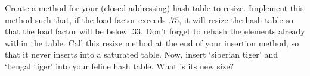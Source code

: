 \begin{problem}
Create a method for your (closed addressing) hash table to resize.
Implement this method such that, if the load factor exceeds $.75$, it will resize the hash table so that the load factor will be below $.33$.
Don't forget to rehash the elements already within the table. 
Call this resize method at the end of your insertion method, so that it never inserts into a saturated table.
Now, insert `siberian tiger' and `bengal tiger' into your feline hash table. What is its new size? 
\label{prob:Hash resizing}
\end{problem}
\begin{comment}
\section*{Sparse Matrices}
Matrices are powerful tools, but they can take a lot of space in memory.
A $n \times n$ matrix takes $n^2$ places of storage!
If every entry in the matrix is useful information this is fine, but if the matrix is filled with a lot of zeros, that means we are using almost $n^2$ spots in memory to store useless zeros.
Not only does this unnecessarily take up space, it means that during computation we will spend a lot of time adding and multiplying zeros.
That can be a lot of useless computation.
The solution to this is \emph{sparse matrices}.
They are other data structures used to represent a matrix by only storing non-zero entries.

One common way is a dictionary.
The index of the spot in the matrix is the key and the number in that spot is the value.
For example,
\[
\begin{pmatrix}
0 & 0 & 0 & 0 & 0 \\
22 & 0 & 0 & 0 & 0 \\
0 & 0 & 0 & 0 & 0 \\
0 & 0 & 5 & 0 & 0 \\
0 & 0 & 0 & 0 & -4
\end{pmatrix}
\]
would be stored as
\[
\begin{tabular}{|c|l|}
\hline
Key & Value \\
\hline
(1,0) & 22 \\
\hline
(3,2) & 5 \\
\hline
(4,4) & -4 \\
\hline
\end{tabular}
\].

In this case, we stored a 5 by 5 matrix in a dictionary with only 3 key-value pairs.


\end{comment}
